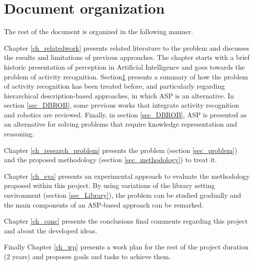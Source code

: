 








\section{Document organization}

The rest of the document is organized in the following manner.

Chapter \ref{ch_relatedwork} presents related literature to the problem and discusses the results and limitations of previous approaches. The chapter starts with a brief historic presentation of perception in Artificial Intelligence and goes towards the problem of activity recognition. Section\ref{} presents a summary of how the problem of activity recognition has been treated before, and particularly regarding hierarchical description-based approaches, in which ASP is an alternative. In section \ref{sec_DBROB}, some previous works that integrate activity recognition and robotics are reviewed. Finally, in section \ref{sec_DBROB}, ASP is presented as an alternative for solving problems that require knowledge representation and reasoning.

Chapter \ref{ch_research_problem} presents the problem (section \ref{sec_problem}) and the proposed methodology (section \ref{sec_methodology}) to treat it. 

Chapter \ref{ch_eva} presents an experimental approach to evaluate the methodology proposed within this project. By using variations of the library setting environment (section \ref{sec_Library}), the problem can be studied gradually and the main components of an ASP-based approach can be remarked.

Chapter \ref{ch_conc} presents the conclusions final comments regarding this project and about the developed ideas.

Finally Chapter \ref{ch_wp} presents a work plan for the rest of the project duration (2 years) and proposes goals and tasks to achieve them. 









